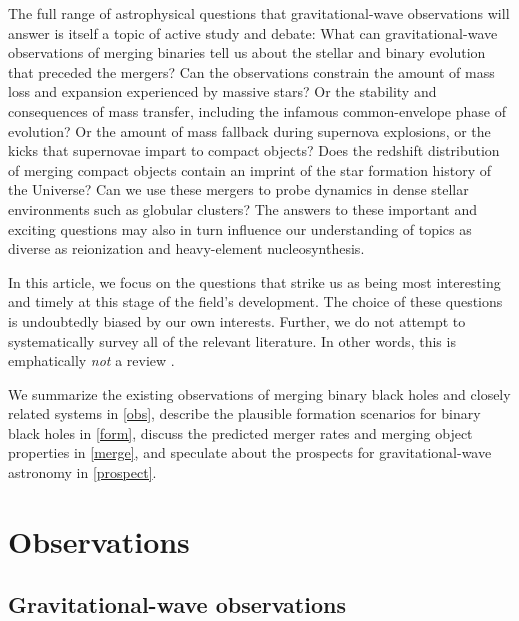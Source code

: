 \documentclass[iop,onecolumn]{revtex4-1}
\begin{document}
The full range of astrophysical questions that gravitational-wave observations will answer is itself a topic of active study and debate: What can gravitational-wave observations of merging binaries tell us about the stellar and binary evolution that preceded the mergers?  Can the observations constrain the amount of mass loss and expansion experienced by massive stars? Or the stability and consequences of mass transfer, including the infamous common-envelope phase of evolution? Or the amount of mass fallback during supernova explosions, or the kicks that supernovae impart to compact objects? Does the redshift distribution of merging compact objects contain an imprint of the star formation history of the Universe?  Can we use these mergers to probe dynamics in dense stellar environments such as globular clusters? The answers to these important and exciting questions may also in turn influence our understanding of topics as diverse as reionization and heavy-element nucleosynthesis.

In this article, we focus on the questions that strike us as being most interesting and timely at this stage of the field's development.  The choice of these questions is undoubtedly biased by our own interests. Further, we do not attempt to systematically survey all of the relevant literature.  In other words, this is emphatically {\it not} a review \citep{magritte}. 

We summarize the existing observations of merging binary black holes and closely related systems in \autoref{obs}, describe the plausible formation scenarios for binary black holes in \autoref{form}, discuss the predicted merger rates and merging object properties in \autoref{merge}, and speculate about the prospects for gravitational-wave astronomy in \autoref{prospect}.


 

\section{Observations}\label{obs}

\subsection{Gravitational-wave observations}
\end{document}
